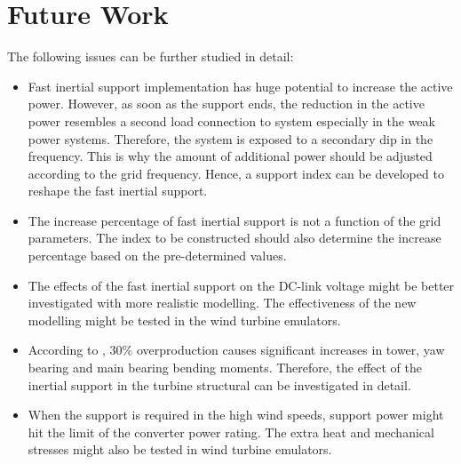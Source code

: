 \section{Future Work}
The following issues can be further studied in detail:
\begin{itemize}
	\item Fast inertial support implementation has huge potential to increase the active power. However, as soon as the support ends, the reduction in the active power resembles a second load connection to system especially in the weak power systems. Therefore, the system is exposed to a secondary dip in the frequency. This is why the amount of additional power should be adjusted according to the grid frequency. Hence, a support index can be developed to reshape the fast inertial support. 
	\item The increase percentage of fast inertial support is not a function of the grid parameters. The index to be constructed should also determine the increase percentage based on the pre-determined values. 
	\item The effects of the fast inertial support on the DC-link voltage might be better investigated with more realistic modelling. The effectiveness of the new modelling might be tested in the wind turbine emulators. 
	\item According to \cite{Altin2018}, 30\% overproduction causes significant increases in  tower, yaw bearing and main bearing bending moments. Therefore, the effect of the inertial support in the turbine structural can be investigated in detail. 
	\item When the support is required in the high wind speeds, support power might hit the limit of the converter power rating. The extra heat and mechanical stresses might also be tested in wind turbine emulators. 
\end{itemize}